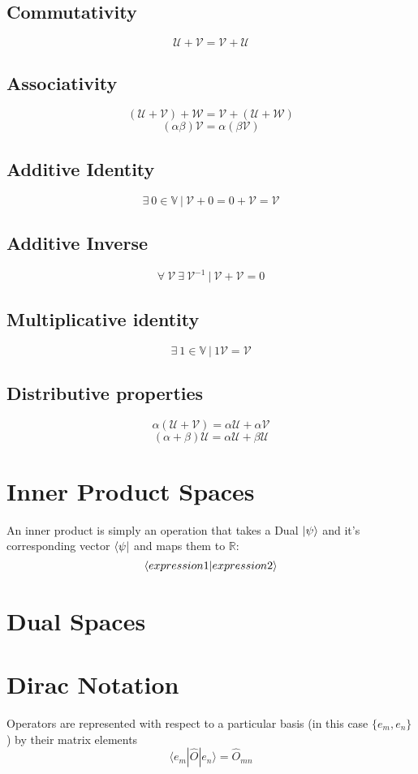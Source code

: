 \subsection{Commutativity}
$$\mathcal{U} + \mathcal{V} = \mathcal{V} + \mathcal{U}$$
\subsection{Associativity}
$$(\mathcal{U} + \mathcal{V}) + \mathcal{W} = \mathcal{V} + (\mathcal{U} + \mathcal{W})$$
$$(\alpha \beta) \mathcal{V} = \alpha (\beta \mathcal{V})$$
\subsection{Additive Identity}
$$\exists \  0 \in \mathbb{V} \ | \ \mathcal{V} + 0 = 0 + \mathcal{V} = \mathcal{V}$$
\subsection{Additive Inverse}
$$\forall \ \mathcal{V} \ \exists \ \mathcal{V}^{-1} \ | \ \mathcal{V} + \mathcal{V} = 0$$
\subsection{Multiplicative identity}
$$\exists \ 1 \in \mathbb{V} \ | \ 1 \mathcal{V} = \mathcal{V}$$
\subsection{Distributive properties}
$$\alpha (\mathcal{U} + \mathcal{V}) = \alpha \mathcal{U} + \alpha \mathcal{V}$$
$$(\alpha + \beta) \mathcal{U} = \alpha \mathcal{U} + \beta \mathcal{U}$$
\section{Inner Product Spaces}
An inner product is simply an operation that takes a Dual $\ket{\psi}$ and it's corresponding vector $\bra{\psi}$ and maps them to $\mathbb{R}$:
$$\braket{expression1}{expression2}$$
\section{Dual Spaces}
\section{Dirac Notation}
Operators are represented with respect to a particular basis (in this case $\{e_{m}, e_{n}\}$) by their matrix elements
\begin{equation}
\langle e_{m}| \hat{O} | {e_n} \rangle = \hat{O}_{mn}
\end{equation}
